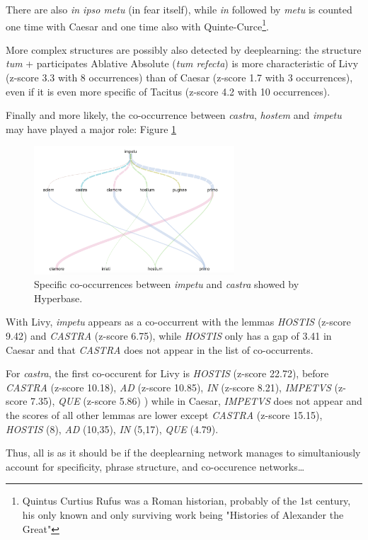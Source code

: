 There are also \textit{in ipso metu} (in fear itself), while \textit{in} followed by \textit{metu} is counted one time with Caesar and one time also with Quinte-Curce\footnote{Quintus Curtius Rufus was a Roman historian, probably of the 1st century, his only known and only surviving work being "Histories of Alexander the Great"}.

More complex structures are possibly also detected by deeplearning: the structure \textit{tum} + participates Ablative Absolute (\textit{tum refecta}) is more characteristic of Livy (z-score 3.3 with 8 occurrences) than of Caesar (z-score 1.7 with 3 occurrences), even if it is even more specific of Tacitus (z-score 4.2 with 10 occurrences).

Finally and more likely, the co-occurrence between \textit{castra}, \textit{hostem} and \textit{impetu} may have played a major role: Figure \ref{latin}

\begin{figure}[h]
\begin{center}
\includegraphics[width=7.5cm]{img/cooc_latin.png}
\caption{Specific co-occurrences between \textit{impetu} and \textit{castra} showed by Hyperbase.}
\label{latin}
\end{center}
\end{figure}

With Livy, \textit{impetu} appears as a co-occurrent with the lemmas \textit{HOSTIS} (z-score 9.42) and \textit{CASTRA} (z-score 6.75), while \textit{HOSTIS} only has a gap of 3.41 in Caesar and that \textit{CASTRA} does not appear in the list of co-occurrents.

For \textit{castra}, the first co-occurent for Livy is \textit{HOSTIS} (z-score 22.72), before \textit{CASTRA} (z-score 10.18), \textit{AD} (z-score 10.85), \textit{IN} (z-score 8.21), \textit{IMPETVS} (z-score 7.35), \textit{QUE} (z-score 5.86) ) while in Caesar, \textit{IMPETVS} does not appear and the scores of all other lemmas are lower except \textit{CASTRA} (z-score 15.15), \textit{HOSTIS} (8),  \textit{AD} (10,35), \textit{IN} (5,17), \textit{QUE} (4.79).

Thus, all is as it should be if the deeplearning network manages to simultaniously account for specificity, phrase structure, and co-occurence networks\ldots


